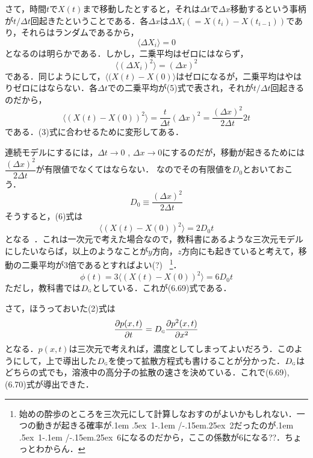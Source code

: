 \documentclass{jsarticle}
\newcommand{\FRAC}[2]{\leavevmode\kern.1em
 \raise.5ex\hbox{\the\scriptfont0 #1}\kern-.1em
 /\kern-.15em\lower.25ex\hbox{\the\scriptfont0 #2}}
\begin{document}
さて，時間$t$で$X(t)$まで移動したとすると，それは$\varDelta t$で$\varDelta x$移動するという事柄が$t/\varDelta t$回起きたということである．各$\varDelta x$は$\varDelta X_i(=X(t_i)-X(t_{i-1}))$であり，それらはランダムであるから，
\begin{equation}
\langle \varDelta X_i \rangle=0
\end{equation}
となるのは明らかである．しかし，二乗平均はゼロにはならず，
\begin{equation}
\langle (\varDelta X_i)^{2} \rangle = (\varDelta x)^{2}
\end{equation}
である．同じようにして，$\langle (X(t)-X(0) \rangle$はゼロになるが，二乗平均はやはりゼロにはならない．各$\varDelta t$での二乗平均が(5)式で表され，それが$t/\varDelta t$回起きるのだから，
\begin{equation}
\langle (X(t)-X(0))^2 \rangle =\dfrac{t}{\varDelta t} (\varDelta x)^2
=\dfrac{(\varDelta x)^2}{2 \varDelta t} 2t
\end{equation}
である．(3)式に合わせるために変形してある．

連続モデルにするには，$\varDelta t \to 0$ , $\varDelta x \to 0$にするのだが，移動が起きるためには$\dfrac{(\varDelta x)^2}{2 \varDelta t}$が有限値でなくてはならない． なのでその有限値を$D_0$とおいておこう．
\begin{equation}
D_0 \equiv \dfrac{(\varDelta x)^2}{2 \varDelta t}
\end{equation}
そうすると，(6)式は
\begin{equation}
\langle (X(t)-X(0))^2 \rangle = 2D_0 t
\end{equation}
となる~\cite{米沢}．これは一次元で考えた場合なので，教科書にあるような三次元モデルにしたいならば，以上のようなことが$y$方向，$z$方向にも起きていると考えて，移動の二乗平均が3倍であるとすればよい(?)~\cite{戸田}  \footnote{始めの酔歩のところを三次元にして計算しなおすのがよいかもしれない．一つの動きが起きる確率が\FRAC{1}{2}だったのが\FRAC{1}{6}になるのだから，ここの係数が6になる??．ちょっとわからん．}．
\begin{equation}
\phi (t) = 3 \langle (X(t)-X(0))^2 \rangle = 6 D_0 t
\end{equation}
ただし，教科書では$D_{\scalebox{0.5}{G}}$としている．これが(6.69)式である．

さて，ほうっておいた(2)式は
\begin{equation}
\frac{\partial p(x,t)}{\partial t}=D_{\scalebox{0.5}{G}} \frac{\partial p^2 (x,t)}{\partial x^2}
\end{equation}
となる．$p(x,t)$は三次元で考えれば，濃度としてしまってよいだろう．このようにして，上で導出した$D_{\scalebox{0.5}{G}}$を使って拡散方程式も書けることが分かった．$D_{\scalebox{0.5}{G}}$はどちらの式でも，溶液中の高分子の拡散の速さを決めている．これで(6.69),(6.70)式が導出できた．
\end{document}
